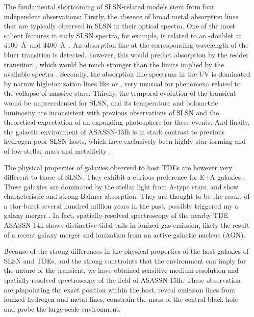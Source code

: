 \documentclass[traditabstract]{aa}
\begin{document}
The fundamental shortcoming of SLSN-related models stem from four independent observations: Firstly, the absence of broad metal absorption lines that are typically observed in SLSN in their optical spectra. One of the most salient features in early SLSN spectra, for example, is related to an -doublet at 4100~\AA~and 4400~\AA~\citep{2011Natur.474..487Q}. An absorption line at the corresponding wavelength of the bluer  transition is detected, however, this would predict absorption by the redder transition \citep{2016MNRAS.458.3455M}, which would be much stronger than the limits implied by the available spectra \citep{2016NatAs...1E...2L, 2017ApJ...836...25M}. Secondly, the absorption line spectrum in the UV is dominated by narrow high-ionization lines like  or , very unusual for phenomena related to the collapse of massive stars. Thirdly,  the temporal evolution of the transient would be unprecedented for SLSN, and its temperature and bolometric luminosity are inconsistent with previous observations of SLSN and the theoretical expectation of an expanding photosphere for these events. And finally, the galactic environment of ASASSN-15lh is in stark contrast to previous hydrogen-poor SLSN hosts, which have exclusively been highly star-forming and of low-stellar mass and metallicity \citep[e.g.,][]{2015MNRAS.449..917L, 2016ApJ...830...13P, 2016arXiv160504925C}.

The physical properties of galaxies observed to host TDEs are however very different to those of SLSN. They exhibit a curious preference  \citep{2014ApJ...793...38A, 2016ApJ...818L..21F} for E+A galaxies \citep{1996ApJ...466..104Z}. These galaxies are dominated by the stellar light from A-type stars, and show characteristic and strong Balmer absorption. They are thought to be the result of a star-burst several hundred million years in the past, possibly triggered my a galaxy merger \citep{1996ApJ...466..104Z}. In fact, spatially-resolved spectroscopy of the nearby TDE ASASSN-14li \citep{2016ApJ...830L..32P} shows distinctive tidal tails in ionized gas emission, likely the result of a recent galaxy merger and ionization from an active galactic nucleus (AGN). 

Because of the strong differences in the physical properties of the host galaxies of SLSN and TDEs, and the strong constraints that the environment can imply for the nature of the transient, we have obtained sensitive medium-resolution and spatially resolved spectroscopy of the field of ASASSN-15lh. These observation are pinpointing the exact position within the host, reveal emission lines from ionized hydrogen and metal lines, constrain the mass of the central black-hole and probe the large-scale environment.
\end{document}
